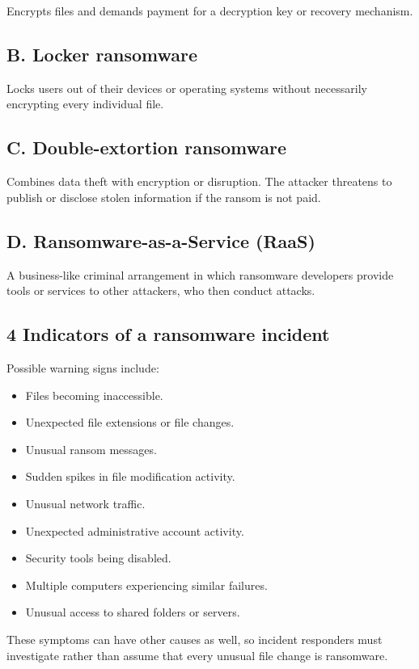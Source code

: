 Encrypts files and demands payment for a decryption key or recovery mechanism.

\subsection{B. Locker ransomware}

Locks users out of their devices or operating systems without necessarily encrypting every individual file.

\subsection{C. Double-extortion ransomware}

Combines data theft with encryption or disruption. The attacker threatens to publish or disclose stolen information if the ransom is not paid.

\subsection{D. Ransomware-as-a-Service (RaaS)}

A business-like criminal arrangement in which ransomware developers provide tools or services to other attackers, who then conduct attacks.

\subsection{4 Indicators of a ransomware incident}

Possible warning signs include:

\begin{itemize}
\item Files becoming inaccessible.
\item Unexpected file extensions or file changes.
\item Unusual ransom messages.
\item Sudden spikes in file modification activity.
\item Unusual network traffic.
\item Unexpected administrative account activity.
\item Security tools being disabled.
\item Multiple computers experiencing similar failures.
\item Unusual access to shared folders or servers.
\end{itemize}

These symptoms can have other causes as well, so incident responders must investigate rather than assume that every unusual file change is ransomware.

